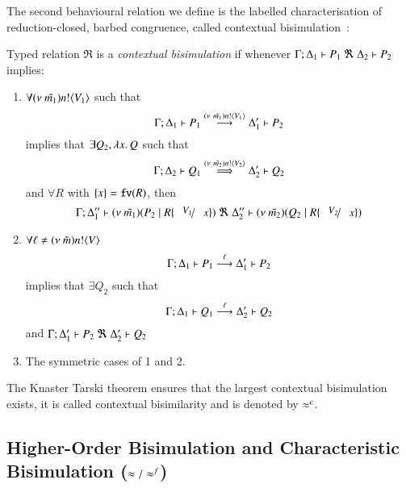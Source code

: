 The second behavioural relation we define is the labelled
characterisation of reduction-closed, barbed congruence,
called contextual bisimulation~\cite{San96H}:
%
\begin{definition}\rm
	\label{def:context_bis}
	Typed relation 
	$\Re$ is a {\em contextual bisimulation} if whenever
	$\horel{\Gamma}{\Delta_1}{P_1}{\ \Re\ }{\Delta_2}{P_2}$ implies:
	\begin{enumerate}
		\item	$\forall (\nu\ \tilde{m_1}) n ! \langle V_1 \rangle$ such that
			\[
				\Gamma; \Delta_1 \vdash P_1 \stackrel{(\nu\ \tilde{m_1}) n ! \langle V_1 \rangle}{\longrightarrow} \Delta_1' \vdash P_2
			\]
			implies that $\exists Q_2, \lambda x.\,Q$ such that
			\[
				\Gamma; \Delta_2 \vdash Q_1 \stackrel{(\nu\ \tilde{m_2}) n ! \langle V_2 \rangle}{\Longrightarrow} \Delta_2' \vdash Q_2
			\]
			and $\forall R$ with $\{x\} = \mathtt{fv}(R)$, 
			then
			\[
				\horel{\Gamma}{\Delta_1''}{\newsp{\tilde{m_1}}{P_2 \Par R\subst{V_1}{x}}}
				{\ \Re\ }
				{\Delta_2''}{\newsp{\tilde{m_2}}{Q_2 \Par R\subst{V_2}{x}}}
			\]
%
		\item	$\forall \ell \not= (\nu\ \tilde{m}) n ! \langle V \rangle$
			\[
				\Gamma; \Delta_1 \vdash P_1 \stackrel{\ell}{\longrightarrow} \Delta_1' \vdash P_2
			\]
			implies that $\exists Q_2$ such that
			\[
				\Gamma; \Delta_1 \vdash Q_1 \stackrel{\ell}{\longrightarrow} \Delta_2' \vdash Q_2
			\]
			and
			$\horel{\Gamma}{\Delta_1'}{P_2}{\ \Re\ }{\Delta_2'}{Q_2}$

		\item	The symmetric cases of 1 and 2.
	\end{enumerate}
%
	The Knaster Tarski theorem ensures that the largest contextual bisimulation exists,
	it is called contextual bisimilarity and is denoted by $\approx^{c}$.
\end{definition}
%

\subsection{Higher-Order Bisimulation and Characteristic Bisimulation ($\approx/\approx^{f}$)}
\label{subsec:char_bis}

